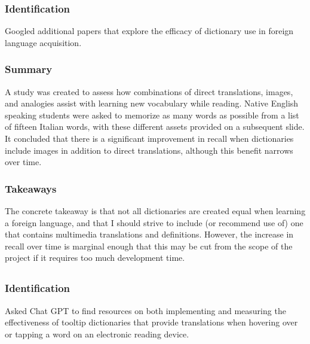 \documentclass[
	letterpaper, %
]{jdf}
\begin{document}
\subsubsection{Identification}
Googled additional papers that explore the efficacy of dictionary use in foreign language acquisition.

\subsubsection{Summary}
A study was created to assess how combinations of direct translations, images, and analogies assist with learning new vocabulary while reading. Native English speaking students were asked to memorize as many words as possible from a list of fifteen Italian words, with these different assets provided on a subsequent slide. It concluded that there is a significant improvement in recall when dictionaries include images in addition to direct translations, although this benefit narrows over time.

\subsubsection{Takeaways}
The concrete takeaway is that not all dictionaries are created equal when learning a foreign language, and that I should strive to include (or recommend use of) one that contains multimedia translations and definitions. However, the increase in recall over time is marginal enough that this may be cut from the scope of the project if it requires too much development time.

\subsection{}
\subsubsection{Identification}
Asked Chat GPT to find resources on both implementing and measuring the effectiveness of tooltip dictionaries that provide translations when hovering over or tapping a word on an electronic reading device.
\end{document}
